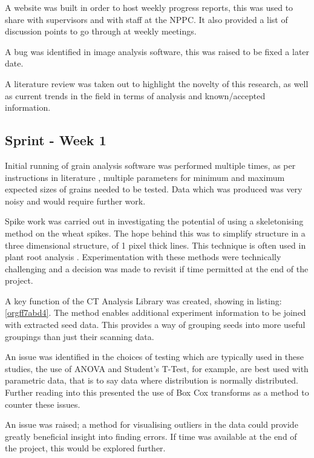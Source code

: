 \documentclass[11pt]{report}
\begin{document}
A website was built in order to host weekly progress reports, this was used to share with supervisors and with staff at the NPPC. It also provided a list of discussion points to go through at weekly meetings.

A bug was identified in image analysis software, this was raised to be fixed a later date.

A literature review was taken out to highlight the novelty of this research, as well as current trends in the field in terms of analysis and known/accepted information.

\subsection{Sprint - Week 1}
\label{sec:org934c360}

Initial running of grain analysis software was performed multiple times, as per instructions in literature \cite{Hughes2017}, multiple parameters for minimum and maximum expected sizes of grains needed to be tested. Data which was produced was very noisy and would require further work.

Spike work was carried out in investigating the potential of using a skeletonising method on the wheat spikes. The hope behind this was to simplify structure in a three dimensional structure, of 1 pixel thick lines. This technique is often used in plant root analysis \cite{Mairhofer2015,Daly2017}. Experimentation with these methods were technically challenging and a decision was made to revisit if time permitted at the end of the project.

A key function of the CT Analysis Library was created, showing in listing:\ref{orgff7abd4}. The method enables additional experiment information to be joined with extracted seed data. This provides a way of grouping seeds into more useful groupings than just their scanning data.

An issue was identified in the choices of testing which are typically used in these studies, the use of ANOVA and Student's T-Test, for example, are best used with parametric data, that is to say data where distribution is normally distributed. Further reading into this presented the use of Box Cox transforms as a method to counter these issues.

An issue was raised; a method for visualising outliers in the data could provide greatly beneficial insight into finding errors. If time was available at the end of the project, this would be explored further.
\end{document}
